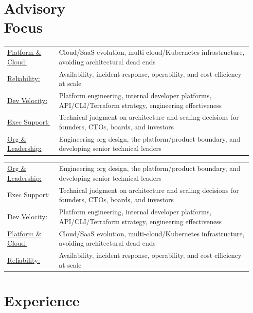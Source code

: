 \begin{resume}
\section{Advisory \\ Focus}
\ifAdvisorVariant
   \begin{tabular}{l p{3.5in}}
    \underline{Platform \& Cloud:} & Cloud/SaaS evolution, multi-cloud/Kubernetes infrastructure, avoiding architectural dead ends \\
    \underline{Reliability:} & Availability, incident response, operability, and cost efficiency at scale \\
    \underline{Dev Velocity:} & Platform engineering, internal developer platforms, API/CLI/Terraform strategy, engineering effectiveness \\
    \underline{Exec Support:} & Technical judgment on architecture and scaling decisions for founders, CTOs, boards, and investors \\
    \underline{Org \& Leadership:} & Engineering org design, the platform/product boundary, and developing senior technical leaders
   \end{tabular}
\else
   \begin{tabular}{l p{3.5in}}
    \underline{Org \& Leadership:} & Engineering org design, the platform/product boundary, and developing senior technical leaders \\
    \underline{Exec Support:} & Technical judgment on architecture and scaling decisions for founders, CTOs, boards, and investors \\
    \underline{Dev Velocity:} & Platform engineering, internal developer platforms, API/CLI/Terraform strategy, engineering effectiveness \\
    \underline{Platform \& Cloud:} & Cloud/SaaS evolution, multi-cloud/Kubernetes infrastructure, avoiding architectural dead ends \\
    \underline{Reliability:} & Availability, incident response, operability, and cost efficiency at scale
   \end{tabular}
\fi

\section{Experience}


\end{resume}
